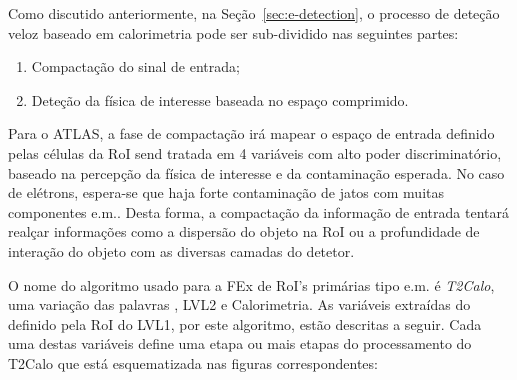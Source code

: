 Como discutido anteriormente, na Seção~\ref{sec:e-detection}, o processo de
deteção veloz baseado em calorimetria pode ser sub-dividido nas seguintes partes:

\begin{enumerate}
\item Compactação do sinal de entrada;
\item Deteção da física de interesse baseada no espaço comprimido.
\end{enumerate}

Para o ATLAS, a fase de compactação irá mapear o espaço de entrada definido
pelas células da RoI send tratada em 4 variáveis com alto poder
discriminatório, baseado na percepção da física de interesse e da contaminação
esperada. No caso de elétrons, espera-se que haja forte contaminação de jatos
com muitas componentes e.m.. Desta forma, a compactação da informação de entrada
tentará realçar informações como a dispersão do objeto na RoI ou a
profundidade de interação do objeto com as diversas camadas do detetor.

O nome do algoritmo usado para a FEx de RoI's primárias tipo e.m. é
\emph{T2Calo}, uma variação das palavras , LVL2 e
Calorimetria. As variáveis extraídas do  definido pela RoI do
LVL1, por este algoritmo, estão descritas a seguir. Cada uma destas variáveis
define uma etapa ou mais etapas do processamento do T2Calo que está
esquematizada nas figuras correspondentes:

